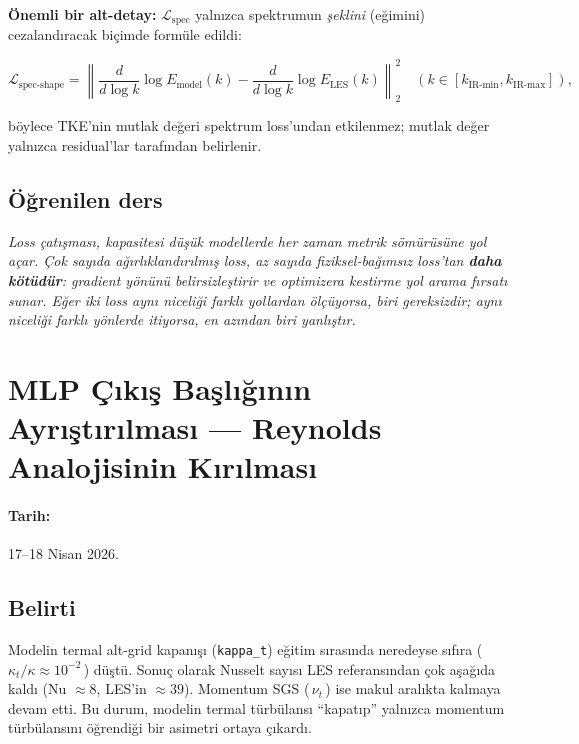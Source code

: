 \textbf{Önemli bir alt-detay:} $\mathcal{L}_{\text{spec}}$ yalnızca spektrumun \textit{şeklini} (eğimini) cezalandıracak biçimde formüle edildi:

\begin{equation}
    \mathcal{L}_{\text{spec-shape}} = \left\| \frac{d}{d\log k}\log E_{\text{model}}(k) - \frac{d}{d\log k}\log E_{\text{LES}}(k) \right\|_2^2 \quad (k \in [k_{\text{IR-min}}, k_{\text{IR-max}}]),
\end{equation}

böylece TKE'nin mutlak değeri spektrum loss'undan etkilenmez; mutlak değer yalnızca residual'lar tarafından belirlenir.

\subsection*{Öğrenilen ders}

\begin{remark}
\textit{Loss çatışması, kapasitesi düşük modellerde her zaman metrik sömürüsüne yol açar. Çok sayıda ağırlıklandırılmış loss, az sayıda fiziksel-bağımsız loss'tan \textbf{daha kötüdür}: gradient yönünü belirsizleştirir ve optimizera kestirme yol arama fırsatı sunar. Eğer iki loss aynı niceliği farklı yollardan ölçüyorsa, biri gereksizdir; aynı niceliği farklı yönlerde itiyorsa, en azından biri yanlıştır.}
\end{remark}


\section{MLP Çıkış Başlığının Ayrıştırılması --- Reynolds Analojisinin Kırılması}
\label{sec:bug_mlp_split}

\paragraph{Tarih:} 17--18 Nisan 2026.

\subsection*{Belirti}

Modelin termal alt-grid kapanışı (\texttt{kappa\_t}) eğitim sırasında neredeyse sıfıra (\,$\kappa_t / \kappa \approx 10^{-2}$\,) düştü. Sonuç olarak Nusselt sayısı LES referansından çok aşağıda kaldı (Nu $\approx 8$, LES'in $\approx 39$). Momentum SGS (\,$\nu_t$\,) ise makul aralıkta kalmaya devam etti. Bu durum, modelin termal türbülansı ``kapatıp'' yalnızca momentum türbülansını öğrendiği bir asimetri ortaya çıkardı.

